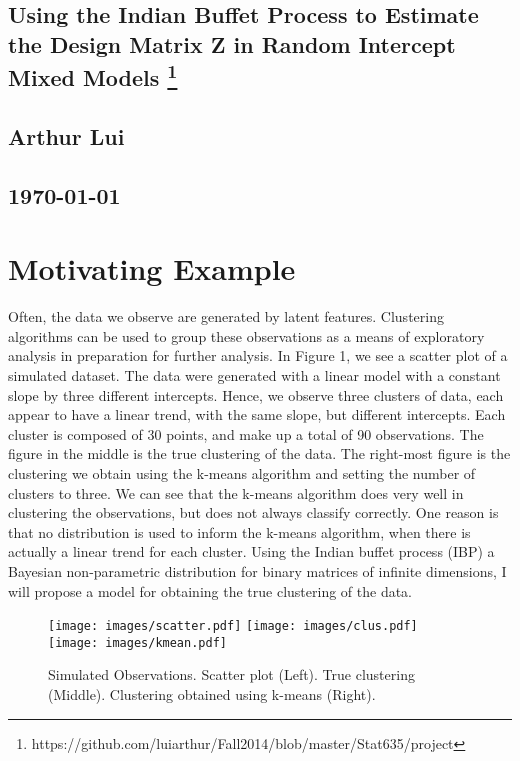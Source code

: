 \documentclass[mathserif]{article}
\def\beginmyfig{\begin{figure}[htbp]\begin{center}}
\def\endmyfig{\end{center}\end{figure}}
\begin{document}
\begin{center}
  \section*{\textbf{Using the Indian Buffet Process to Estimate the Design Matrix Z in Random Intercept Mixed Models}
    \footnote{https://github.com/luiarthur/Fall2014/blob/master/Stat635/project}
  }
  \subsection*{\textbf{Arthur Lui}}
  \subsection*{\noindent\today}
\end{center}


\section*{Motivating Example}
Often, the data we observe are generated by latent features. Clustering
algorithms can be used to group these observations as a means of exploratory
analysis in preparation for further analysis. In Figure 1, we see a scatter
plot of a simulated dataset. The data were generated with a linear model with a
constant slope by three different intercepts. Hence, we observe three clusters
of data, each appear to have a linear trend, with the same slope, but different
intercepts.  Each cluster is composed of 30 points, and make up a total of 90
observations.  The figure in the middle is the true clustering of the data. The
right-most figure is the clustering we obtain using the k-means algorithm and
setting the number of clusters to three. We can see that the k-means algorithm
does very well in clustering the observations, but does not always classify
correctly. One reason is that no distribution is used to inform the k-means
algorithm, when there is actually a linear trend for each cluster. Using the
Indian buffet process (IBP) a Bayesian non-parametric distribution for binary
matrices of infinite dimensions, I will propose a model for obtaining the true
clustering of the data.

  \beginmyfig
    \texttt{[image: images/scatter.pdf]}
    \texttt{[image: images/clus.pdf]}
    \texttt{[image: images/kmean.pdf]}
    \vspace{-5mm}
    \caption{Simulated Observations. Scatter plot (Left). True clustering (Middle). Clustering
             obtained using k-means (Right).}
  \endmyfig
\end{document}
